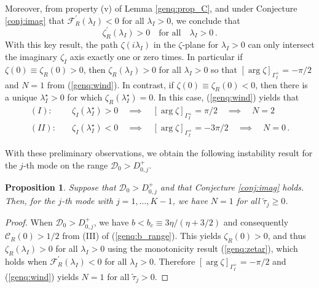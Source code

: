 \documentclass{article}%
\newtheorem{prop}[theorem]{Proposition}
\newcommand{\bsub}{\begin{subequations}}
\newcommand{\esub}{\end{subequations}$\!$}
\newcommand{\dzjp}{D^{+}_{0,j}}
\begin{document}
Moreover, from property (v) of Lemma \ref{genq:prop_C}, and under 
Conjecture \ref{conj:imag} that ${\mathcal F}_R^{\prime}(\lambda_I)<0$
for all $\lambda_I>0$, we conclude that
\begin{equation}
\zeta_{R}^{\prime}(\lambda_{I})>0 \quad \mbox{for all} \quad
\lambda_{I}>0\,.\label{genq:zetar}
\end{equation}
With this key result, the path $\zeta(i\lambda_I)$ in the
$\zeta$-plane for $\lambda_I>0$ can only intersect the imaginary
$\zeta_I$ axis exactly one or zero times. In particular if
$\zeta(0)\equiv \zeta_R(0)>0$, then $\zeta_R(\lambda_I)>0$ for all
$\lambda_I>0$ so that $\left[\arg \zeta \right]_{\Gamma_I^{+}} =
-{\pi/2}$ and $N=1$ from (\ref{genq:wind}). In contrast, if
$\zeta(0)\equiv \zeta_R(0)<0$, then there is a unique
$\lambda_{I}^{\star}>0$ for which $\zeta_R(\lambda_I^{\star})=0$. In
this case, (\ref{genq:wind}) yields that
\bsub\label{genq:one_cross}
\begin{align}
   (I):\quad &  \zeta_I(\lambda_I^{\star})>0 \quad \implies  \quad
\left[\arg \zeta \right]_{\Gamma_I^{+}} = {\pi/2} \quad \implies \quad N=2\,
 \label{genq:N=2} \\
   (II):\quad &  \zeta_I(\lambda_I^{\star})<0 \quad \implies  \quad
\left[\arg \zeta \right]_{\Gamma_I^{+}} = {-3\pi/2} \quad \implies \quad N=0\,.
 \label{genq:N=0} 
\end{align}
\esub

With these preliminary observations, we obtain the following
instability result for the $j$-th mode on the range ${\mathcal D}_0>\dzjp$.

\begin{prop}\label{prop:genq:N=1} Suppose that ${\mathcal D}_0>\dzjp$ and 
that Conjecture \ref{conj:imag} holds. Then, for the $j$-th mode with
$j=1,\ldots,K-1$, we have $N=1$ for all $\tilde{\tau}_j\geq 0$.
\end{prop}

\begin{proof} When ${\mathcal D}_0>\dzjp$, we have 
$b<b_c\equiv {3\eta/(\eta+{3/2})}$ and consequently ${\mathcal
    C}_R(0)>{1/2}$ from (III) of (\ref{genq:b_range}). This yields
  $\zeta_R(0)>0$, and thus $\zeta_R(\lambda_I)>0$ for all
  $\lambda_I>0$ using the monotonicity result (\ref{genq:zetar}),
  which holds when ${\mathcal F}_R^{\prime}(\lambda_I)<0$ for all
  $\lambda_I>0$. Therefore $\left[\arg \zeta \right]_{\Gamma_I^{+}}
  =-{\pi/2}$ and (\ref{genq:wind}) yields $N=1$ for all
  $\tilde{\tau}_j>0$.
\end{proof}
\end{document}
